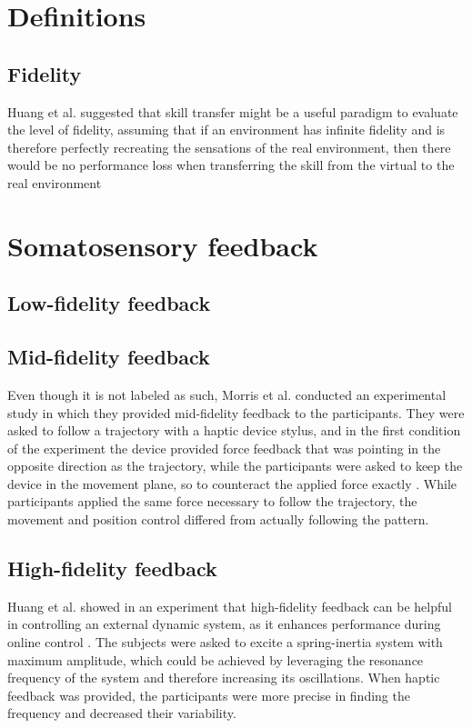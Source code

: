 \section{Definitions}
\subsection{Fidelity}
Huang et al. suggested that skill transfer might be a useful paradigm to evaluate the level of fidelity, assuming that if an environment has infinite fidelity and is therefore perfectly recreating the sensations of the real environment, then there would be no performance loss when transferring the skill from the virtual to the real environment \cite{Huang2006}

\section{Somatosensory feedback}
\subsection{Low-fidelity feedback}

\subsection{Mid-fidelity feedback}
Even though it is not labeled as such, Morris et al. conducted an experimental study in which they provided mid-fidelity feedback to the participants. They were asked to follow a trajectory with a haptic device stylus, and in the first condition of the experiment the device provided force feedback that was pointing in the opposite direction as the trajectory, while the participants were asked to keep the device in the movement plane, so to counteract the applied force exactly \cite{Morris2007}. While participants applied the same force necessary to follow the trajectory, the movement and position control differed from actually following the pattern.



\subsection{High-fidelity feedback}
Huang et al. showed in an experiment that high-fidelity feedback can be helpful in controlling an external dynamic system, as it enhances performance during online control \cite{Huang2007}. The subjects were asked to excite a spring-inertia system with maximum amplitude, which could be achieved by leveraging the resonance frequency of the system and therefore increasing its oscillations. When haptic feedback was provided, the participants were more precise in finding the frequency and decreased their variability.

